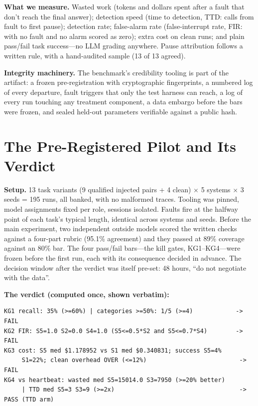 \documentclass[acmsmall,screen]{acmart}
\begin{document}
\textbf{What we measure.} Wasted work (tokens and dollars spent after a fault
that don't reach the final answer); detection speed (time to detection, TTD:
calls from fault to first pause); detection rate; false-alarm rate (false-interrupt
rate, FIR: with no fault and no alarm scored as zero); extra cost on clean runs;
and plain pass/fail task success---no LLM grading anywhere. Pause attribution follows a written rule, with a hand-audited
sample (13 of 13 agreed).

\textbf{Integrity machinery.} The benchmark's credibility tooling is part of
the artifact: a frozen pre-registration with cryptographic fingerprints, a
numbered log of every departure, fault triggers that only the test harness can
reach, a log of every run touching any treatment component, a data embargo
before the bars were frozen, and sealed held-out parameters verifiable against a
public hash.

\section{The Pre-Registered Pilot and Its Verdict}
\textbf{Setup.} 13 task variants (9 qualified injected pairs + 4 clean) $\times$
5 systems $\times$ 3 seeds = 195 runs, all banked, with no malformed traces.
Tooling was pinned, model assignments fixed per role, sessions isolated. Faults
fire at the halfway point of each task's typical length, identical across
systems and seeds. Before the main experiment, two independent outside models
scored the written checks against a four-part rubric (95.1\% agreement) and they
passed at 89\% coverage against an 80\% bar. The four pass/fail bars---the kill gates, KG1--KG4---were frozen
before the first run, each with its consequence decided in advance. The decision
window after the verdict was itself pre-set: 48 hours, ``do not negotiate with
the data''.

\textbf{The verdict (computed once, shown verbatim):}

\begin{lstlisting}
KG1 recall: 35% (>=60%) | categories >=50%: 1/5 (>=4)            -> FAIL
KG2 FIR: S5=1.0 S2=0.0 S4=1.0 (S5<=0.5*S2 and S5<=0.7*S4)        -> FAIL
KG3 cost: S5 med $1.178952 vs S1 med $0.340831; success S5=4%
     S1=22%; clean overhead OVER (<=12%)                          -> FAIL
KG4 vs heartbeat: wasted med S5=15014.0 S3=7950 (>=20% better)
     | TTD med S5=3 S3=9 (>=2x)                                   -> PASS (TTD arm)
\end{lstlisting}
\end{document}
